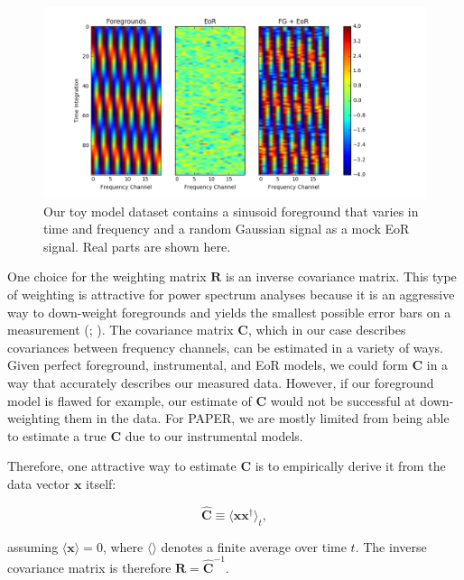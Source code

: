 \documentclass[preprint2,numberedappendix,tighten]{aastex6}  %
\begin{document}
\begin{figure}
	\centering
	\includegraphics[trim={1.5cm 0.2cm 3.5cm 0.3cm},clip,width=\columnwidth]{plots/toy_sigloss1.png}
	\caption{Our toy model dataset contains a sinusoid foreground that varies in time and frequency and a random Gaussian signal as a mock EoR signal. Real parts are shown here.}
	\label{fig:toy_sigloss1}
\end{figure}

One choice for the weighting matrix $\textbf{R}$ is an inverse covariance matrix. This type of weighting is attractive for power spectrum analyses because it is an aggressive way to down-weight foregrounds and yields the smallest possible error bars on a measurement (\citealt{tegmark_et_al1997a}; \citealt{bond_et_al1998}). The covariance matrix $\textbf{C}$, which in our case describes covariances between frequency channels, can be estimated in a variety of ways. Given perfect foreground, instrumental, and EoR models, we could form $\textbf{C}$ in a way that accurately describes our measured data. However, if our foreground model is flawed for example, our estimate of $\textbf{C}$ would not be successful at down-weighting them in the data. For PAPER, we are mostly limited from being able to estimate a true $\textbf{C}$ due to our instrumental models.

Therefore, one attractive way to estimate $\textbf{C}$ is to empirically derive it from the data vector $\textbf{x}$ itself:

\begin{equation}
\hat{\textbf{C}} \equiv \langle\textbf{xx}^{\dagger}\rangle_{t},
\end{equation}

\noindent assuming $\langle\textbf{x}\rangle = 0$, where $\langle \rangle$ denotes a finite average over time $t$. The inverse covariance matrix is therefore $\textbf{R} = \hat{\textbf{C}}^{-1}$. 
\end{document}
